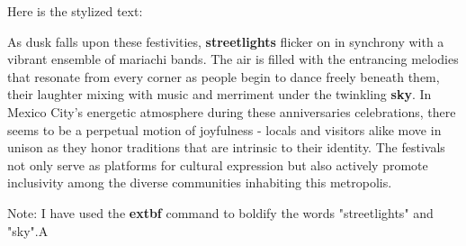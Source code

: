 \documentclass[12pt, a4paper]{article}
\begin{document}
Here is the stylized text:

As dusk falls upon these festivities, \textbf{streetlights} flicker on in synchrony with a vibrant ensemble of mariachi bands. The air is filled with the entrancing melodies that resonate from every corner as people begin to dance freely beneath them, their laughter mixing with music and merriment under the twinkling \textbf{sky}. In Mexico City's energetic atmosphere during these anniversaries celebrations, there seems to be a perpetual motion of joyfulness - locals and visitors alike move in unison as they honor traditions that are intrinsic to their identity. The festivals not only serve as platforms for cultural expression but also actively promote inclusivity among the diverse communities inhabiting this metropolis.

Note: I have used the \textbf{extbf} command to boldify the words "streetlights" and "sky".A

  
\end{document}
